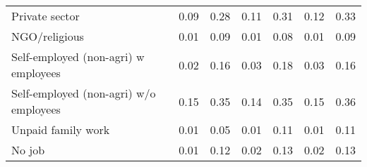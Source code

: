 \begin{table}[htbp]
{\begin{tabular}{lcccccc}
     Private sector & 0.09  & 0.28  & 0.11  & 0.31  & 0.12  & 0.33 \\
     NGO/religious & 0.01  & 0.09  & 0.01  & 0.08  & 0.01  & 0.09 \\
     Self-employed (non-agri) w employees & 0.02  & 0.16  & 0.03  & 0.18  & 0.03  & 0.16 \\
     Self-employed (non-agri) w/o employees & 0.15  & 0.35  & 0.14  & 0.35  & 0.15  & 0.36 \\
     Unpaid family work & 0.01  & 0.05  & 0.01  & 0.11  & 0.01  & 0.11 \\
          No job & 0.01  & 0.12  & 0.02  & 0.13  & 0.02  & 0.13 \\
    \bottomrule
    \end{tabular}}
    \end{table}